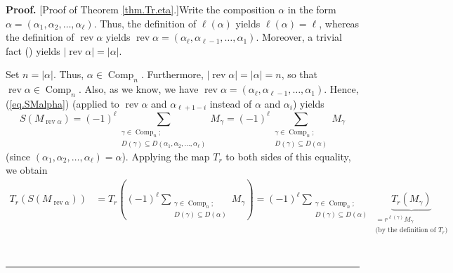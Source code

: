 \documentclass[numbers=enddot,12pt,final,onecolumn,notitlepage]{scrartcl}%
\theoremstyle{definition}
\newenvironment{proof}[1][Proof]{\noindent\textbf{#1.} }{\ \rule{0.5em}{0.5em}}
\let\sumnonlimits\sum
\renewcommand{\sum}{\sumnonlimits\limits}
\newenvironment{vershort}{}{}
\begin{document}
\begin{proof}
[Proof of Theorem \ref{thm.Tr.eta}.]Write the composition $\alpha$ in the form
$\alpha=\left(  \alpha_{1},\alpha_{2},\ldots,\alpha_{\ell}\right)  $. Thus,
the definition of $\ell\left(  \alpha\right)  $ yields $\ell\left(
\alpha\right)  =\ell$, whereas the definition of $\operatorname*{rev}\alpha$
yields $\operatorname*{rev}\alpha=\left(  \alpha_{\ell},\alpha_{\ell-1}%
,\ldots,\alpha_{1}\right)  $. Moreover, a trivial fact (\cite[Proposition
3.3]{comps}) yields $\left\vert \operatorname*{rev}\alpha\right\vert
=\left\vert \alpha\right\vert $.

\begin{vershort}
Set $n=\left\vert \alpha\right\vert $. Thus, $\alpha\in\operatorname*{Comp}%
\nolimits_{n}$. Furthermore, $\left\vert \operatorname*{rev}\alpha\right\vert
=\left\vert \alpha\right\vert =n$, so that $\operatorname*{rev}\alpha
\in\operatorname*{Comp}\nolimits_{n}$. Also, as we know, we have
$\operatorname*{rev}\alpha=\left(  \alpha_{\ell},\alpha_{\ell-1},\ldots
,\alpha_{1}\right)  $. Hence, (\ref{eq.SMalpha}) (applied to
$\operatorname*{rev}\alpha$ and $\alpha_{\ell+1-i}$ instead of $\alpha$ and
$\alpha_{i}$) yields%
\[
S\left(  M_{\operatorname*{rev}\alpha}\right)  =\left(  -1\right)  ^{\ell}%
\sum_{\substack{\gamma\in\operatorname*{Comp}\nolimits_{n};\\D\left(
\gamma\right)  \subseteq D\left(  \alpha_{1},\alpha_{2},\ldots,\alpha_{\ell
}\right)  }}M_{\gamma}=\left(  -1\right)  ^{\ell}\sum_{\substack{\gamma
\in\operatorname*{Comp}\nolimits_{n};\\D\left(  \gamma\right)  \subseteq
D\left(  \alpha\right)  }}M_{\gamma}%
\]
(since $\left(  \alpha_{1},\alpha_{2},\ldots,\alpha_{\ell}\right)  =\alpha$).
Applying the map $T_{r}$ to both sides of this equality, we obtain%
\begin{align*}
T_{r}\left(  S\left(  M_{\operatorname*{rev}\alpha}\right)  \right)   &
=T_{r}\left(  \left(  -1\right)  ^{\ell}\sum_{\substack{\gamma\in
\operatorname*{Comp}\nolimits_{n};\\D\left(  \gamma\right)  \subseteq D\left(
\alpha\right)  }}M_{\gamma}\right)  =\left(  -1\right)  ^{\ell}\sum
_{\substack{\gamma\in\operatorname*{Comp}\nolimits_{n};\\D\left(
\gamma\right)  \subseteq D\left(  \alpha\right)  }}\underbrace{T_{r}\left(
M_{\gamma}\right)  }_{\substack{=r^{\ell\left(  \gamma\right)  }M_{\gamma
}\\\text{(by the definition of }T_{r}\text{)}}}\\

\end{align*}
\end{vershort}
\end{proof}
\end{document}
